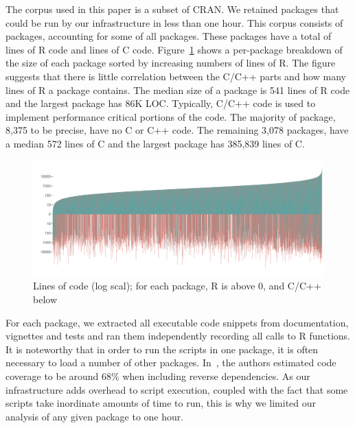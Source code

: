 \documentclass[acmsmall,10pt,review,anonymous]{acmart}\settopmatter{printfolios=true,printccs=false,printacmref=false}
\begin{document}
The corpus used in this paper is a subset of CRAN. We retained packages that
could be run by our infrastructure in less than one hour. This corpus
consists of \PACKAGES packages, accounting for some \PERCENTCRAN of all
packages.  These packages have a total of \RLOC lines of R code and \CLOC
lines of C code. Figure~\ref{allcloc} shows a per-package breakdown of the
size of each package sorted by increasing numbers of lines of R. The figure
suggests that there is little correlation between the C/C++ parts and how
many lines of R a package contains. The median size of a package is 541
lines of R code and the largest package has 86K LOC. Typically, C/C++ code
is used to implement performance critical portions of the code. The majority
of package, 8,375 to be precise, have no C or C++ code.  The remaining 3,078
packages, have a median 572 lines of C and the largest package has 385,839
lines of C.

\begin{figure}[!b]\begin{center}
\includegraphics[width=.9\textwidth]{linesofrandccode}
\caption{Lines of code (log scal); for each package, R is above 0, and C/C++
  below}\label{allcloc}\end{center}
\end{figure}


For each package, we extracted all executable code snippets from
documentation, vignettes and tests and ran them independently recording all
calls to R functions.  It is noteworthy that in order to run the scripts in
one package, it is often necessary to load a number of other packages.
In~\cite{issta18}, the authors estimated code coverage to be around 68\%
when including reverse dependencies.  As our infrastructure adds overhead to
script execution, coupled with the fact that some scripts take inordinate
amounts of time to run, this is why we limited our analysis of any given
package to one hour.  
\end{document}
